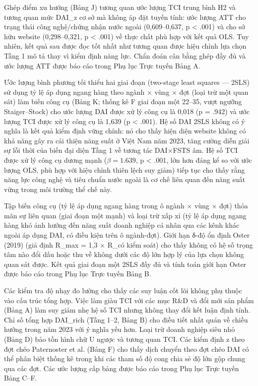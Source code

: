 \documentclass[12pt,a4paper]{article}
\begin{document}
Ghép điểm xu hướng (Bảng J) tương quan ước lượng TCI trung bình H2 và
tương quan mức DAI\_z cơ sở mà không áp đặt tuyến tính: ước lượng ATT
cho trạng thái công nghệ/chứng nhận nước ngoài (0,609--0,637, p
\textless{} .001) và cho sở hữu website (0,298--0,321, p \textless{}
.001) về thực chất phù hợp với kết quả OLS. Tuy nhiên, kết quả sau được
đọc tốt nhất như tương quan được hiệu chỉnh lựa chọn Tầng 1 mô tả thay
vì kiểm định năng lực. Chẩn đoán cân bằng ghép đầy đủ và ước lượng ATT
được báo cáo trong Phụ lục Trực tuyến Bảng A.

Ước lượng bình phương tối thiểu hai giai đoạn (two-stage least squares
--- 2SLS) sử dụng tỷ lệ áp dụng ngang hàng theo ngành × vùng × đợt (loại
trừ một quan sát) làm biến công cụ (Bảng K; thống kê F giai đoạn một
22--35, vượt ngưỡng Staiger--Stock) cho ước lượng DAI được xử lý công cụ
là 0,018 (p = .942) và ước lượng TCI được xử lý công cụ là 1,639 (p
\textless{} .001). Hệ số DAI 2SLS không có ý nghĩa là kết quả kiểm định
vững chính: nó cho thấy hiện diện website không có khả năng gây ra cải
thiện năng suất ở Việt Nam năm 2023, tăng cường diễn giải sự lỗi thời
của biến đại diện Tầng 1 về tương tác DAI×FSTS âm. Hệ số TCI được xử lý
công cụ dương mạnh (\(\beta = 1.639\), p \textless{} .001, lớn hơn đáng
kể so với ước lượng OLS, phù hợp với hiệu chỉnh thiên lệch suy giảm)
tiếp tục cho thấy rằng năng lực công nghệ và tiêu chuẩn nước ngoài là cơ
chế liên quan đến năng suất vững trong môi trường thể chế này.

Tập biến công cụ (tỷ lệ áp dụng ngang hàng trong ô ngành × vùng × đợt)
thỏa mãn sự liên quan (giai đoạn một mạnh) và loại trừ xấp xỉ (tỷ lệ áp
dụng ngang hàng khó ảnh hưởng đến năng suất doanh nghiệp cá nhân qua các
kênh khác ngoài áp dụng DAI, có điều kiện trên ô ngành-đợt). Giới hạn
δ-độ ổn định Oster (2019) (giả định R\_max = 1,3 × R\_có kiểm soát) cho
thấy không có hệ số trọng tâm nào đổi dấu hoặc thu về không dưới các độ
lớn hợp lý của lựa chọn không quan sát được. Kết quả giai đoạn một 2SLS
đầy đủ và tính toán giới hạn Oster được báo cáo trong Phụ lục Trực tuyến
Bảng B.

Các kiểm tra độ nhạy đo lường cho thấy các suy luận cốt lõi không phụ
thuộc vào cấu trúc tổng hợp. Việc làm giàu TCI với các mục R\&D và đổi
mới sản phẩm (Bảng A) làm suy giảm nhẹ hệ số TCI nhưng không thay đổi
kết luận định tính. Chỉ số tổng hợp DAI\_rich (Tầng 1--2, Bảng B) cho
điều tiết nhất quán về chiều hướng trong năm 2023 với ý nghĩa yếu hơn.
Loại trừ doanh nghiệp siêu nhỏ (Bảng D) bảo tồn hình chữ U ngược và
tương quan TCI. Các kiểm định z theo đợt chéo Paternoster et al. (Bảng
F) cho thấy dịch chuyển theo đợt chéo DAI có thể phân biệt thống kê
trong khi các tham số độ cong chia sẻ độ lớn gộp chung qua các đợt. Các
ước lượng cấp bảng được báo cáo trong Phụ lục Trực tuyến Bảng C--F.
\end{document}
